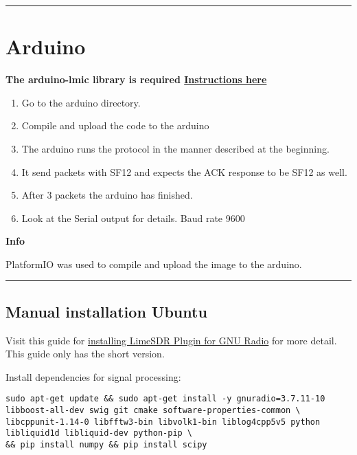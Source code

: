 \begin{center}\rule{0.5\linewidth}{\linethickness}\end{center}

\section{Arduino}\label{arduino}

\textbf{The arduino-lmic library is required
\href{https://github.com/matthijskooijman/arduino-lmic}{Instructions
here}}

\begin{enumerate}
\def\labelenumi{\arabic{enumi}.}
\tightlist
\item
  Go to the arduino directory.
\item
  Compile and upload the code to the arduino
\item
  The arduino runs the protocol in the manner described at the
  beginning.
\item
  It send packets with SF12 and expects the ACK response to be SF12 as
  well.
\item
  After 3 packets the arduino has finished.
\item
  Look at the Serial output for details. Baud rate 9600
\end{enumerate}

\textbf{Info}

PlatformIO was used to compile and upload the image to the arduino.

\begin{center}\rule{0.5\linewidth}{\linethickness}\end{center}

\subsection{Manual installation
Ubuntu}\label{manual-installation-ubuntu}

Visit this guide for
\href{https://wiki.myriadrf.org/Gr-limesdr_Plugin_for_GNURadio}{installing
LimeSDR Plugin for GNU Radio} for more detail. This guide only has the
short version.

Install dependencies for signal processing:

\begin{verbatim}
sudo apt-get update && sudo apt-get install -y gnuradio=3.7.11-10 libboost-all-dev swig git cmake software-properties-common \
libcppunit-1.14-0 libfftw3-bin libvolk1-bin liblog4cpp5v5 python libliquid1d libliquid-dev python-pip \
&& pip install numpy && pip install scipy
\end{verbatim}

